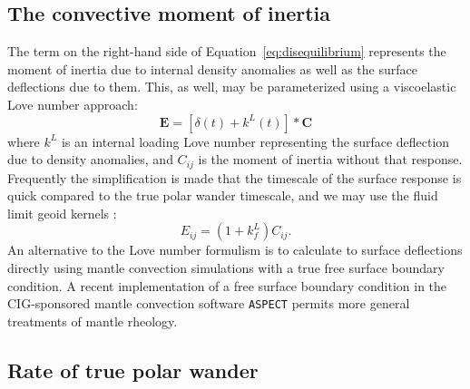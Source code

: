\documentclass[extra,mreferee]{gji}
\begin{document}
\subsection{The convective moment of inertia}
\label{sec:convective_moment}

The term on the right-hand side of Equation~\eqref{eq:disequilibrium} represents the moment of inertia due to internal density anomalies as well as the surface deflections due to them.
This, as well, may be parameterized using a viscoelastic Love number approach:
\begin{equation} 
\mathbf{E} = \left[ \delta(t) + k^L(t) \right] * \mathbf{C}
\end{equation}
where $k^L$ is an internal loading Love number representing the surface deflection due to density anomalies, and $C_{ij}$ is the moment of inertia without that response.
Frequently the simplification is made that the timescale of the surface response is quick compared to the true polar wander timescale, and we may use the fluid limit geoid kernels \citep[e.g.][]{richards1984geoid}:  
\begin{equation}
E_{ij} = (1+k^L_f) C_{ij}.
\end{equation}
An alternative to the Love number formulism is to calculate to surface deflections directly using mantle convection simulations with a true free surface boundary condition.
A recent implementation of a free surface boundary condition in the CIG-sponsored mantle convection software \texttt{ASPECT} \citep{rose2016free}
permits more general treatments of mantle rheology.

\subsection{Rate of true polar wander}
\label{sec:tpw_rate}
\end{document}
